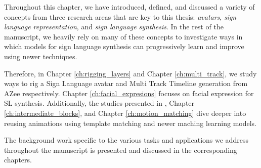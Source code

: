 \documentclass[../../main.tex]{subfiles}
\begin{document}
Throughout this chapter, we have introduced, defined, and discussed a variety of concepts from three research areas that are key to this thesis: \textit{avatars}, \textit{sign language representation}, and \textit{sign language synthesis}. In the rest of the manuscript, we heavily rely on many of these concepts to investigate ways in which models for sign language synthesis can progressively learn and improve using newer techniques.

Therefore, in Chapter \ref{ch:rigging_layers} and Chapter \ref{ch:multi_track}, we study ways to rig a Sign Language avatar and Multi Track Timeline generation from AZee respectively. Chapter \ref{ch:facial_expresions} focuses on facial expression for SL synthesis. Additionally, the studies presented in , Chapter \ref{ch:intermediate_blocks}, and Chapter \ref{ch:motion_matching} dive deeper into reusing animations using template matching and newer maching learning models.

The background work specific to the various tasks and applications we address throughout the manuscript is presented and discussed in the corresponding chapters.
\end{document}
